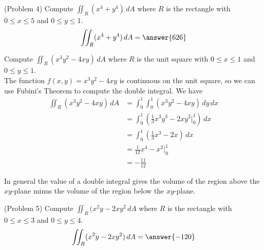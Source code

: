 \documentclass[handout]{ximera}
\begin{document}
\begin{problem}(Problem 4)
Compute $\iint_R (x^4 + y^4) \, dA$ where $R$ is the rectangle with $0 \leq x \leq 5$ and $0 \leq y \leq 1$.\\
\[
\iint_R (x^4 + y^4) \, dA = \answer{626}
\]
\end{problem}

\begin{example}[Example 5]
Compute $\iint_R (x^3y^2 - 4xy) \, dA$ where $R$ is the unit square with $0 \leq x \leq 1$ and $0 \leq y \leq 1$.\\
The function $f(x,y) = x^3y^2 - 4xy$ is continuous on the unit square, so we can use Fubini's Theorem to compute the double integral.
We have
\begin{align*}
\iint_R (x^3y^2 - 4xy) \, dA &= \int_0^1 \int_0^1 (x^3y^2 - 4xy) \, dy\, dx\\
                          &= \int_0^1 \left(\frac13 x^3 y^3  - 2xy^2 \bigg|_0^1 \right) \, dx\\
                          &= \int_0^1 \left(\frac13 x^3 - 2x \right) \, dx\\
                          &= \frac{1}{12} x^4 - x^2 \bigg|_0^1\\
                          &= -\frac{11}{12}
\end{align*}
\end{example}

\begin{remark}
In general the value of a double integral gives the volume of the region above the $xy$-plane minus
the volume of the region below the $xy$-plane.
\end{remark}

\begin{problem}(Problem 5)
Compute $\iint_R (x^2y - 2xy^2 \, dA$ where $R$ is the rectangle with $0 \leq x \leq 3$ and $0 \leq y \leq 4$.\\
\[
\iint_R (x^2 y -2xy^2) \, dA = \answer{-120}
\]
\end{problem}
\end{document}
